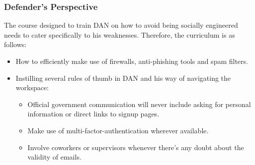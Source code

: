\subsubsection{Defender's Perspective}
The course designed to train DAN on how to avoid being socially engineered needs to cater specifically to his weaknesses. Therefore, the curriculum is as follows:
\begin{itemize}
    \item How to efficiently make use of firewalls, anti-phishing tools and spam filters.
    \item Instilling several rules of thumb in DAN and his way of navigating the workspace:
          \begin{itemize}
              \item Official government communication will never include asking for personal information or direct links to signup pages.
              \item Make use of multi-factor-authentication wherever available.
              \item Involve coworkers or supervisors whenever there's any doubt about the validity of emails.
          \end{itemize}
\end{itemize}